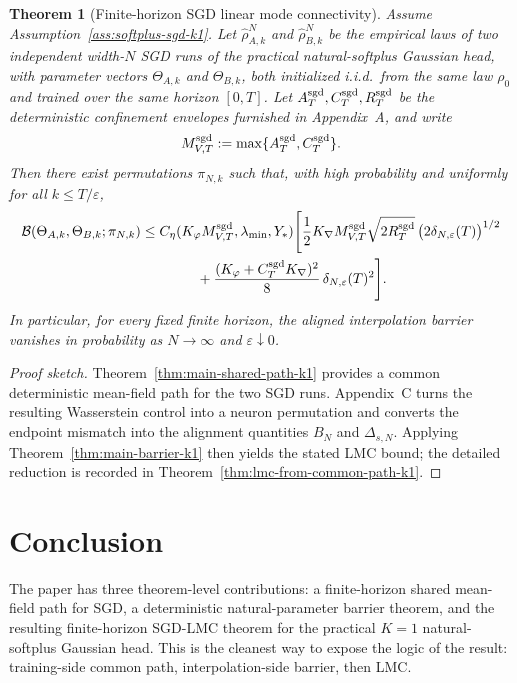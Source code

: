 \documentclass[11pt]{article}
\newtheorem{theorem}{Theorem}
\theoremstyle{definition}
\newcommand{\cB}{\mathcal{B}}
\begin{document}
\begin{theorem}[Finite-horizon SGD linear mode connectivity]
\label{thm:main-sgd-lmc-k1}
Assume Assumption~\ref{ass:softplus-sgd-k1}. Let
$\hat\rho_{A,k}^N$ and $\hat\rho_{B,k}^N$ be the empirical laws of two
independent width-$N$ SGD runs of the practical natural-softplus Gaussian head,
with parameter vectors $\Theta_{A,k}$ and $\Theta_{B,k}$, both initialized
i.i.d.\ from the same law $\rho_0$ and trained over the same horizon $[0,T]$.
Let
$A_T^{\rm sgd},C_T^{\rm sgd},R_T^{\rm sgd}$ be the deterministic confinement
envelopes furnished in Appendix~A, and write
\[
  M_{V,T}^{\rm sgd}:=\max\{A_T^{\rm sgd},C_T^{\rm sgd}\}.
\]
Then there exist permutations $\pi_{N,k}$ such that, with high probability and
uniformly for all $k\le T/\varepsilon$,
\begin{align}
  \cB(\Theta_{A,k},\Theta_{B,k};\pi_{N,k})
  &\le
  C_\eta(K_\varphi M_{V,T}^{\rm sgd},\lambda_{\min},Y_\ast)
  \Biggl[
    \frac12 K_{\nabla}M_{V,T}^{\rm sgd}\sqrt{2R_T^{\rm sgd}}\,
    \bigl(2\delta_{N,\varepsilon}(T)\bigr)^{1/2}
    \nonumber\\
  &\qquad\qquad
    +
    \frac{(K_\varphi+C_T^{\rm sgd}K_{\nabla})^2}{8}\,
    \delta_{N,\varepsilon}(T)^2
  \Biggr].
  \label{eq:main-sgd-lmc-k1}
\end{align}
In particular, for every fixed finite horizon, the aligned interpolation
barrier vanishes in probability as $N\to\infty$ and $\varepsilon\downarrow 0$.
\end{theorem}

\begin{proof}[Proof sketch]
Theorem~\ref{thm:main-shared-path-k1} provides a common deterministic
mean-field path for the two SGD runs. Appendix~C turns the resulting
Wasserstein control into a neuron permutation and converts the endpoint mismatch
into the alignment quantities $B_N$ and $\Delta_{s,N}$. Applying
Theorem~\ref{thm:main-barrier-k1} then yields the stated LMC bound; the
detailed reduction is recorded in Theorem~\ref{thm:lmc-from-common-path-k1}.
\end{proof}

\section{Conclusion}

The paper has three theorem-level contributions: a finite-horizon shared
mean-field path for SGD, a deterministic natural-parameter barrier theorem, and
the resulting finite-horizon SGD-LMC theorem for the practical $K=1$
natural-softplus Gaussian head. This is the cleanest way to expose the logic of
the result: training-side common path, interpolation-side barrier, then LMC.
\end{document}
